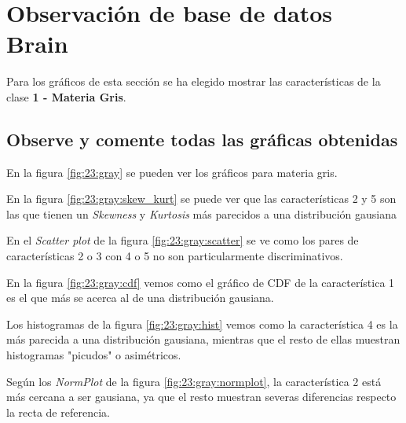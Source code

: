 \documentclass[11pt]{article} %
\begin{document}
\section{Observación de base de datos Brain}

Para los gráficos de esta sección se ha elegido mostrar las características de la clase \textbf{1 - Materia Gris}.

\subsection[Observaciones]{Observe y comente todas las gráficas obtenidas}

En la figura \ref{fig:23:gray} se pueden ver los gráficos para materia gris.

En la figura \ref{fig:23:gray:skew_kurt} se puede ver que las características 2 y 5 son las que tienen un \emph{Skewness} y \emph{Kurtosis} más parecidos a una distribución gausiana

En el \emph{Scatter plot} de la figura \ref{fig:23:gray:scatter} se ve como los pares de características 2 o 3 con 4 o 5 no son particularmente discriminativos.

En la figura \ref{fig:23:gray:cdf} vemos como el gráfico de CDF de la característica 1 es el que más se acerca al de una distribución gausiana.

Los histogramas de la figura \ref{fig:23:gray:hist} vemos como la característica 4 es la más parecida a una distribución gausiana, mientras que el resto de ellas muestran histogramas "picudos" o asimétricos.

Según los \emph{NormPlot} de la figura \ref{fig:23:gray:normplot}, la característica 2 está más cercana a ser gausiana, ya que el resto muestran severas diferencias respecto la recta de referencia.
\end{document}

